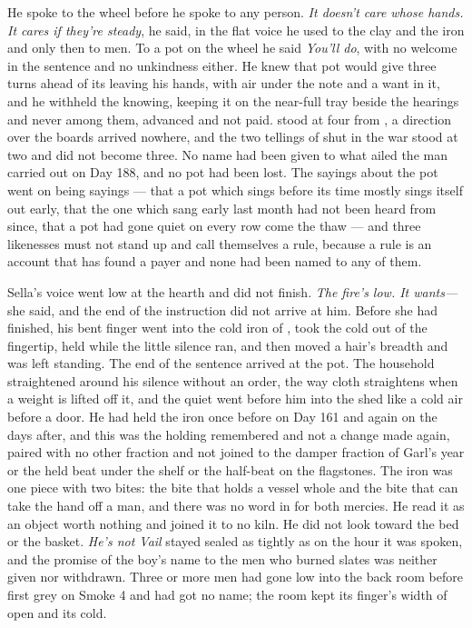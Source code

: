 He spoke to the wheel before he spoke to any person. \emph{It doesn't care whose hands. It cares if they're steady}, he said, in the flat voice he used to the clay and the iron and only then to men. To a pot on the wheel he said \emph{You'll do}, with no welcome in the sentence and no unkindness either. He knew  that pot would give three turns ahead of its leaving his hands, with air under the note and a want in it, and he withheld the knowing, keeping it on the near-full tray beside the hearings and never among them, advanced and not paid.  stood at four from , a direction over the boards arrived nowhere, and the two tellings of  shut in the war stood at two and did not become three. No name had been given to what ailed the man carried out on Day 188, and no pot had been lost. The sayings about the pot went on being sayings --- that a pot which sings before its time mostly sings itself out early, that the one which sang early last month had not been heard from since, that a pot had gone quiet on every row come the thaw --- and three likenesses must not stand up and call themselves a rule, because a rule is an account that has found a payer and none had been named to any of them.

Sella's voice went low at the hearth and did not finish. \emph{The fire's low. It wants---} she said, and the end of the instruction did not arrive at him. Before she had finished, his bent finger went into the cold iron of , took the cold out of the fingertip, held while the little silence ran, and then moved a hair's breadth and was left standing. The end of the sentence arrived at the pot. The household straightened around his silence without an order, the way cloth straightens when a weight is lifted off it, and the quiet went before him into the shed like a cold air before a door. He had held the iron once before on Day 161 and again on the days after, and this was the holding remembered and not a change made again, paired with no other fraction and not joined to the damper fraction of Garl's year or the held beat under the shelf or the half-beat on the flagstones. The iron was one piece with two bites: the bite that holds a vessel whole and the bite that can take the hand off a man, and there was no word in  for both mercies. He read it as an object worth nothing and joined it to no kiln. He did not look toward the bed or the basket. \emph{He's not Vail} stayed sealed as tightly as on the hour it was spoken, and the promise of the boy's name to the men who burned slates was neither given nor withdrawn. Three or more men had gone low into the back room before first grey on Smoke 4 and had got no name; the room kept its finger's width of open and its cold.

